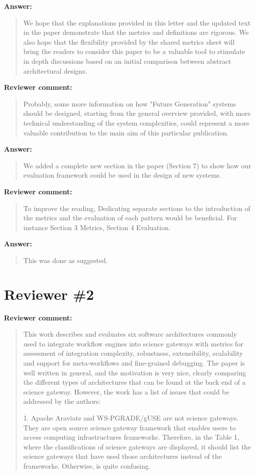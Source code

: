 \documentclass[a4]{article}
\newenvironment{review}%
{\textbf{Reviewer comment:}\begin{quote}}%
{\end{quote}}%
\newenvironment{answer}%
{\textbf{Answer:}\begin{small}\begin{quote}}%
{\end{quote}\end{small}}%
\begin{document}
\begin{answer}
  We hope that the explanations provided in this letter and the
  updated text in the paper demonstrate that the metrics and
  definitions are rigorous. We also hope that the flexibility provided
  by the shared metrics sheet will bring the readers to consider this
  paper to be a valuable tool to stimulate in depth discussions based
  on an initial comparison between abstract architectural designs.
\end{answer}

\begin{review}
  Probably, some more information on how "Future Generation" systems
  should be designed, starting from the general overview provided,
  with more technical understanding of the system complexities, could
  represent a more valuable contribution to the main aim of this
  particular publication.
\end{review}

\begin{answer}
  We added a complete new section in the paper (Section 7) to show how our
  evaluation framework could be used in the design of new systems.
\end{answer}

\begin{review}
  To improve the reading, Dedicating separate sections to the
  introduction of the metrics and the evaluation of each pattern would
  be beneficial. For instance Section 3 Metrics, Section 4 Evaluation.
\end{review}

\begin{answer}
  This was done as suggested.
\end{answer}

\section{Reviewer \#2}

\begin{review}
  This work describes and evaluates six software architectures
  commonly used to integrate workflow engines into science gateways
  with metrics for assessment of integration complexity, robustness,
  extensibility, scalability and support for meta-workflows and
  fine-grained debugging. The paper is well written in general, and
  the motivation is very nice, clearly comparing the different types
  of architectures that can be found at the back end of a science
  gateway. However, the work has a list of issues that could be
  addressed by the authors:

1. Apache Araviate and WS-PGRADE/gUSE are not science gateways. They
are open source science gateway framework that enables users to access
computing infrastructures frameworks. Therefore, in the Table 1, where
the classifications of science gateways are displayed, it should list
the science gateways that have used those architectures instead of the
frameworks. Otherwise, is quite confusing.
\end{review}
\end{document}
